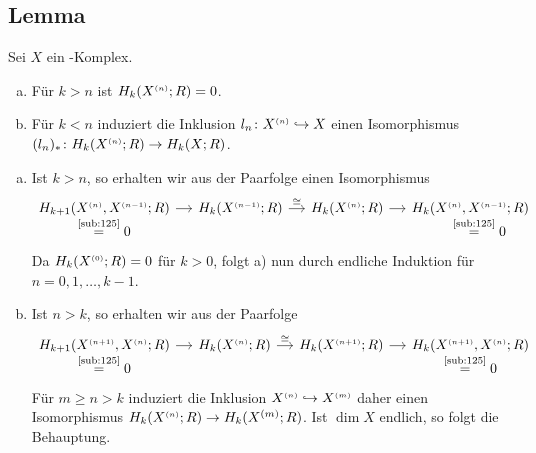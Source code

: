\subsection[Lemma über die Homologie des $n$-Gerüsts und die von $X^\ssbrace{n} \hookrightarrow X$ induzierte Abbildung]{Lemma} %
\label{sub:129}
Sei $X$ ein \CW-Komplex.
\begin{enumerate}[a)]
	\item Für $k >n$ ist $H_k(X^{\scriptscriptstyle(n)};R)=0$.
	\item Für $k <n$ induziert die Inklusion $l_n\colon X^{\scriptscriptstyle(n)} \hookrightarrow X$ einen Isomorphismus $(l_n)_* \colon H_k(X^{\scriptscriptstyle(n)};R) \to H_k(X;R)$.
\end{enumerate}
\begin{enumerate}[a)]
	\item Ist $k>n$, so erhalten wir aus der Paarfolge einen Isomorphismus
	\[
		\begin{tikzcd}[column sep=small]
			\underset{\textstyle\stackrel{\mbox{{\scriptsize\ref{sub:125}}}}{=} 0}{H_{k+1}\enbrace*{X^\ssbrace{n}, X^\ssbrace{n-1};R}} \rar &  H_k(X^\ssbrace{n-1};R) \rar["\cong"] & 
			H_k(X^\ssbrace{n};R) \rar 
			& H_k \underset{\textstyle\stackrel{\mbox{\scriptsize\ref{sub:125}}}{=}0}{\enbrace*{X^\ssbrace{n}, X^\ssbrace{n-1};R} }
		\end{tikzcd}
	\]
	Da $H_k(X^{{\scriptscriptstyle(0)}};R)=0$ für $k>0$, folgt a) nun durch endliche Induktion für $n=0,1, \ldots , k-1$.
	\item Ist $n >k$, so erhalten wir aus der Paarfolge
	\[
		\begin{tikzcd}[column sep=small]
			\underset{\textstyle\stackrel{\mbox{\scriptsize\ref{sub:125}}}{=}0}{H_{k+1} \enbrace*{X^\ssbrace{n+1},X^\ssbrace{n};R}} \rar & H_k \enbrace*{X^\ssbrace{n};R} \rar["\cong"] 
			& H_k \enbrace*{X^\ssbrace{n+1};R} \rar 
			& \underset{\textstyle\stackrel{\mbox{\scriptsize\ref{sub:125}}}{=}0}{H_k \enbrace*{X^\ssbrace{n+1},X^\ssbrace{n};R}   }
		\end{tikzcd}
	\]
	Für $m \ge n >k$ induziert die Inklusion $X^{\scriptscriptstyle(n)} \hookrightarrow X^{{\scriptscriptstyle(m)}}$ daher einen Isomorphismus $H_k(X^{\scriptscriptstyle(n)};R) \to H_k(X^{(m)};R)$. Ist $\dim X$ endlich, so folgt
	die Behauptung. 
	

\end{enumerate}
